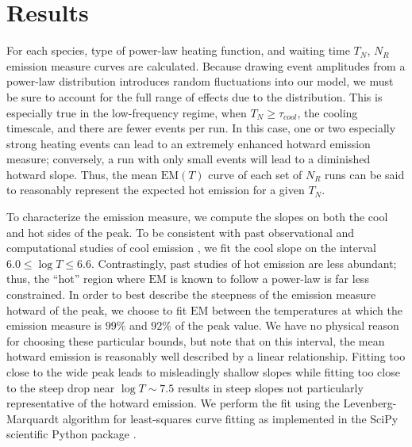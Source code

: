 \documentclass[apj]{emulateapj}
\begin{document}
	\section{Results}
	\label{sec:results}
	\par For each species, type of power-law heating function, and waiting time $T_N$, $N_{R}$ emission measure curves are calculated. Because drawing event amplitudes from a power-law distribution introduces random fluctuations into our model, we must be sure to account for the full range of effects due to the distribution. This is especially true in the low-frequency regime, when $T_N\ge\tau_{cool}$, the cooling timescale, and there are fewer events per run. In this case, one or two especially strong heating events can lead to an extremely enhanced hotward emission measure; conversely, a run with only small events will lead to a diminished hotward slope. Thus, the mean $\mathrm{EM}(T)$ curve of each set of $N_{R}$ runs can be said to reasonably represent the expected hot emission for a given $T_N$.
	\par To characterize the emission measure, we compute the slopes on both the cool and hot sides of the peak. To be consistent with past observational and computational studies of cool emission \citep[see][and references therein]{bradshaw_diagnosing_2012}, we fit the cool slope on the interval $6.0\le\log{T}\le6.6$. Contrastingly, past studies of hot emission are less abundant; thus, the ``hot'' region where $\mathrm{EM}$ is known to follow a power-law is far less constrained. In order to best describe the steepness of the emission measure hotward of the peak, we choose to fit $\mathrm{EM}$ between the temperatures at which the emission measure is $99\%$ and $92\%$ of the peak value. We have no physical reason for choosing these particular bounds, but note that on this interval, the mean hotward emission is reasonably well described by a linear relationship. Fitting too close to the wide peak leads to misleadingly shallow slopes while fitting too close to the steep drop near $\log{T}\sim7.5$ results in steep slopes not particularly representative of the hotward emission. We perform the fit using the Levenberg-Marquardt algorithm for least-squares curve fitting as implemented in the SciPy scientific Python package \citep{van_der_walt_numpy_2011}.
\end{document}
